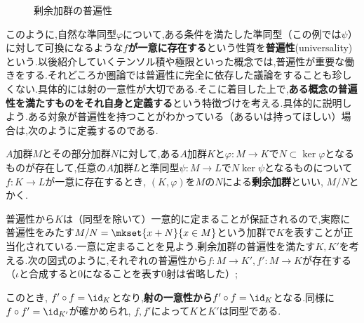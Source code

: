 \begin{figure}[H]
	\centering
	\caption{剰余加群の普遍性}
\end{figure}

このように,自然な準同型$\varphi$について,ある条件を満たした準同型（この例では$\psi$）に対して可換になるような\textbf{$f$が一意に存在する}という性質を\textbf{普遍性}(universality)という.以後紹介していくテンソル積や極限といった概念では,普遍性が重要な働きをする.それどころか圏論では普遍性に完全に依存した議論をすることも珍しくない.具体的には射の一意性が大切である.そこに着目した上で,\textbf{ある概念の普遍性を満たすものをそれ自身と定義する}という特徴づけを考える.具体的に説明しよう.ある対象が普遍性を持つことがわかっている（あるいは持ってほしい）場合は,次のように定義するのである.

\begin{defi}[普遍性による剰余加群の定義]
	$A$加群$M$とその部分加群$N$に対して,ある$A$加群$K$と$\varphi:M\to K$で$N\subset\ker\varphi$となるものが存在して,任意の$A$加群$L$と準同型$\psi:M\to L$で$N\ker\psi$となるものについて$f:K\to L$が一意に存在するとき, $(K,\varphi)$を$M$の$N$による\textbf{剰余加群}といい, $M/N$とかく.
\end{defi}

普遍性から$K$は（同型を除いて）一意的に定まることが保証されるので,実際に普遍性をみたす$M/N=\mkset{x+N}{x\in M}$という加群で$K$を表すことが正当化されている.一意に定まることを見よう.剰余加群の普遍性を満たす$K,K'$を考える.次の図式のように,それぞれの普遍性から$f:M\to K',f':M\to K$が存在する（$\iota$と合成すると$0$になることを表す$0$射は省略した）;
\begin{figure}[H]
	\centering
	\caption{}
\end{figure}

このとき, $f'\circ f=\id_K$となり,\textbf{射の一意性から}$f'\circ f=\id_K$となる.同様に$f\circ f'=\id_{K'}$が確かめられ, $f,f'$によって$K$と$K'$は同型である.

